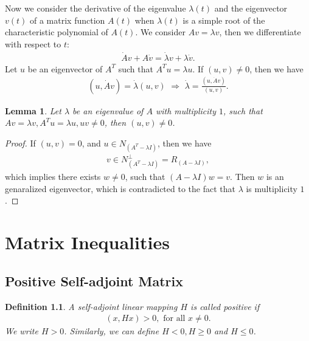\documentclass[11pt]{book}
\newtheorem{definition}{Definition}[section]
\newtheorem{lemma}[theorem]{Lemma}
\theoremstyle{definition}
\numberwithin{equation}{subsection}
\begin{document}
Now we consider the derivative of the eigenvalue $\lambda(t)$ and the eigenvector $v(t)$ of a matrix function $A(t)$ when $\lambda(t)$ is a simple root of the characteristic polynomial of $A(t)$. We consider $Av = \lambda v$, then we differentiate with respect to $t$:
\begin{align*}
    \dot{A}v + A\dot{v} = \dot{\lambda}v + \lambda \dot{v}.
\end{align*}
Let $u$ be an eigenvector of $A^T$ such that $A^T u = \lambda u$. If $(u,v)\neq 0$, then we have
\begin{align*}
    (u,\dot{A}v) = \dot{\lambda} (u,v)\,\, \Rightarrow \,\, \dot{\lambda} = \frac{(u,\dot{A}v)}{(u,v)}.
\end{align*}

\begin{lemma}
Let $\lambda$ be an eigenvalue of $A$ with multiplicity $1$, such that $Av = \lambda v, A^Tu = \lambda u, uv \neq 0$, then $(u,v)\neq 0$.
\end{lemma}
\begin{proof}
If $(u,v) = 0$, and $u\in N_{\left(A^T - \lambda I\right)}$, then we have 
\begin{align*}
    v \in N_{\left(A^T - \lambda I\right)}^\perp = R_{\left(A - \lambda I\right)},
\end{align*}
which implies there exists $w\neq 0$, such that $(A - \lambda I)w = v$. Then $w$ is an genaralized eigenvector, which is contradicted to the fact that $\lambda$ is multiplicity $1$.
\end{proof}

\medskip


\chapter{Matrix Inequalities}

\section{Positive Self-adjoint Matrix}

\begin{definition}
A self-adjoint linear mapping $H$ is called positive if 
\begin{align*}
    (x, Hx) > 0,\,\, \text{for all} \,\, x \neq 0.
\end{align*}
We write $H > 0$. Similarly, we can define $H < 0, H \geq 0$ and $H \leq 0$.
\end{definition}

\medskip
\end{document}

